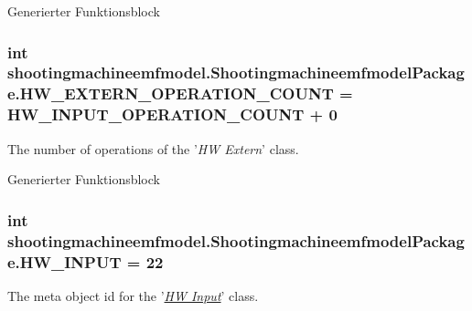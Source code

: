 Generierter Funktionsblock  \hypertarget{interfaceshootingmachineemfmodel_1_1_shootingmachineemfmodel_package_a509c88e538f3bdfaec8ece9d4893b897}{
\subsubsection[{H\-W\-\_\-\-E\-X\-T\-E\-R\-N\-\_\-\-O\-P\-E\-R\-A\-T\-I\-O\-N\-\_\-\-C\-O\-U\-N\-T}]{\setlength{\rightskip}{0pt plus 5cm}int shootingmachineemfmodel.\-Shootingmachineemfmodel\-Package.\-H\-W\-\_\-\-E\-X\-T\-E\-R\-N\-\_\-\-O\-P\-E\-R\-A\-T\-I\-O\-N\-\_\-\-C\-O\-U\-N\-T = {\bf H\-W\-\_\-\-I\-N\-P\-U\-T\-\_\-\-O\-P\-E\-R\-A\-T\-I\-O\-N\-\_\-\-C\-O\-U\-N\-T} + 0}}\label{interfaceshootingmachineemfmodel_1_1_shootingmachineemfmodel_package_a509c88e538f3bdfaec8ece9d4893b897}
The number of operations of the '{\itshape H\-W Extern}' class.

Generierter Funktionsblock  \hypertarget{interfaceshootingmachineemfmodel_1_1_shootingmachineemfmodel_package_ac939588ce4eb2f893f81c08e82d43c06}{
\subsubsection[{H\-W\-\_\-\-I\-N\-P\-U\-T}]{\setlength{\rightskip}{0pt plus 5cm}int shootingmachineemfmodel.\-Shootingmachineemfmodel\-Package.\-H\-W\-\_\-\-I\-N\-P\-U\-T = 22}}\label{interfaceshootingmachineemfmodel_1_1_shootingmachineemfmodel_package_ac939588ce4eb2f893f81c08e82d43c06}
The meta object id for the '\hyperlink{classshootingmachineemfmodel_1_1impl_1_1_h_w_input_impl}{{\itshape H\-W Input}}' class.

